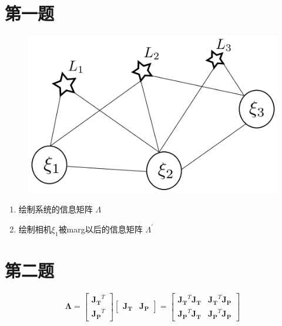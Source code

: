 \documentclass[12pt,a4paper]{article}
\begin{document}
\maketitle

\section*{第一题} 

\begin{figure}[htbp] 
	\centering
	\includegraphics[width=12cm]{bayers_01.png}
\end{figure} 

\begin{enumerate}

\item 绘制系统的信息矩阵 $\Lambda$

\begin{figure}[!h]
  \centering
  
\end{figure}

\newpage

\item 绘制相机$\xi_1$被marg以后的信息矩阵 $\Lambda^{\prime}$

\begin{figure}[!h]
  \centering
  
\end{figure}

\end{enumerate}


\section*{第二题}

\noindent
\setlength{\parindent}{2em}
\setlength{\parskip}{0.3em}

$$
\boldsymbol{\Lambda} = 
\begin{bmatrix}
\mathbf{J_T}^T \\ \mathbf{J_P}^T
\end{bmatrix}
\begin{bmatrix}
\mathbf{J_T} & \mathbf{J_P}
\end{bmatrix} = 
\begin{bmatrix}
\mathbf{J_T}^T \mathbf{J_T} & \mathbf{J_T}^T \mathbf{J_P} \\
\mathbf{J_P}^T \mathbf{J_T} & \mathbf{J_P}^T \mathbf{J_P}
\end{bmatrix}
$$
\end{document}
